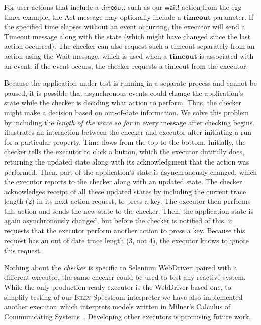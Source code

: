 \documentclass[sigplan,nonacm,10pt]{acmart}
\makeatletter
\newcommand{\Specstrom}[0]{%
  \if@ACM@anonymous%
  \textsc{Billy}%
  \else%
  Specstrom%
  \fi\xspace}
\makeatother
\begin{document}
For user actions that include a $\textsf{timeout}$, such as our $\mathsf{wait!}$ action from the egg timer example, the \textsf{Act} message
may optionally include a $\textbf{timeout}$ parameter. If the specified time elapses without an event occurring, the executor will send a \textsf{Timeout} message
along with the state (which might have changed since the last action occurred). The checker can also request such a timeout separately from an action
using the \textsf{Wait} message, which is used when a $\textbf{timeout}$ is associated with an event: if the event occurs, the checker requests a timeout from the executor.

Because the application under test is running in a separate process and cannot be paused, it is possible that asynchronous events could change the application's state while the checker is deciding what action to perform. Thus, the checker
might make a decision based on out-of-date information. We solve this problem by including the \emph{length of the trace so far} in every message after checking begins.  illustrates an interaction between the checker and executor after initiating a run for a particular property. Time flows
from the top to the bottom.
Initially, the checker tells the executor to \textsf{click} a button, which the executor dutifully does, returning the updated state
along with its acknowledgment that the action was performed. Then, part of the application's state is asynchronously \textsf{changed},
which the executor reports to the checker along with an updated state. The checker acknowledges receipt of all these updated states by
including the current trace length ($2$) in its next action request, to press a key. The executor then performs this action and sends the new state to
the checker. Then, the application state is again asynchronously \textsf{changed}, but before the checker is notified of this, it requests that the executor
perform another action to press a key. Because this request has an out of date trace length ($3$, not $4$), the executor knows to ignore this request.

Nothing about the \emph{checker} is specific to Selenium WebDriver: paired with a different executor, the same checker could be used to test any reactive system.
While the only production-ready executor is the WebDriver-based one, to simplify testing of our \Specstrom interpreter we have also implemented another executor, which interprets models written in Milner's Calculus of Communicating Systems~\citep{ccs}.
Developing other executors is promising future work.
\end{document}
